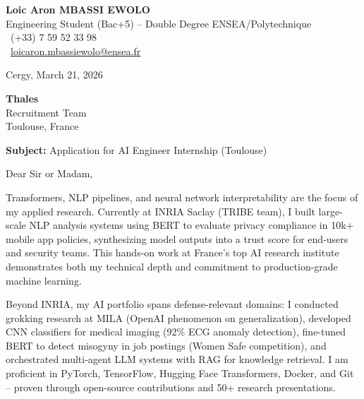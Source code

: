\documentclass[a4paper,11pt]{article}
\begin{document}
\noindent
\begin{minipage}[t]{0.5\textwidth}
    \textbf{Loic Aron MBASSI EWOLO}\\
    Engineering Student (Bac+5) -- Double Degree ENSEA/Polytechnique\\[3pt]
    \Mobilefone\ (+33) 7 59 52 33 98\\
    \Letter\ \href{mailto:loicaron.mbassiewolo@ensea.fr}{loicaron.mbassiewolo@ensea.fr}
\end{minipage}
\hfill
\begin{minipage}[t]{0.4\textwidth}
    \raggedleft
    Cergy, March 21, 2026
\end{minipage}

\vspace{1.2cm}

\hfill
\begin{minipage}[t]{0.5\textwidth}
    \raggedleft
    \textbf{Thales} \\
    Recruitment Team \\
    Toulouse, France
\end{minipage}

\vspace{1cm}

\noindent\textbf{Subject:} Application for AI Engineer Internship (Toulouse)

\vspace{0.8cm}

Dear Sir or Madam,

Transformers, NLP pipelines, and neural network interpretability are the focus of my applied research. Currently at INRIA Saclay (TRIBE team), I built large-scale NLP analysis systems using BERT to evaluate privacy compliance in 10k+ mobile app policies, synthesizing model outputs into a trust score for end-users and security teams. This hands-on work at France's top AI research institute demonstrates both my technical depth and commitment to production-grade machine learning.

Beyond INRIA, my AI portfolio spans defense-relevant domains: I conducted grokking research at MILA (OpenAI phenomenon on generalization), developed CNN classifiers for medical imaging (92\% ECG anomaly detection), fine-tuned BERT to detect misogyny in job postings (Women Safe competition), and orchestrated multi-agent LLM systems with RAG for knowledge retrieval. I am proficient in PyTorch, TensorFlow, Hugging Face Transformers, Docker, and Git -- proven through open-source contributions and 50+ research presentations.
\end{document}
